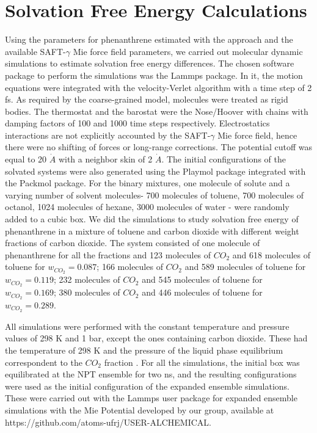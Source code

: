 \section{Solvation Free Energy Calculations}\label{solvme}

Using the parameters for phenanthrene estimated with the  approach and the available SAFT-$\gamma$ Mie force field parameters, we carried out molecular dynamic simulations to estimate solvation free energy differences. The chosen software package to perform the simulations was the Lammps package\cite{lammps}. In it, the motion equations were integrated with the velocity-Verlet algorithm \cite{verlet} with a time step of 2 fs. As required by the coarse-grained model,  molecules were treated as rigid bodies. The thermostat and the barostat were the Nose/Hoover with chains with damping factors of 100 and 1000 time steps respectively. Electrostatics interactions are not explicitly accounted by the SAFT-$\gamma$ Mie force field, hence there were no shifting of forces or long-range corrections. The potential cutoff was equal to 20 $\dot{A}$ \cite{muller2017} with a neighbor skin of 2 $\dot{A}$. The initial configurations of the solvated systems were also generated using the Playmol package integrated with the Packmol package. For the binary mixtures, one molecule of solute and a varying number of solvent molecules- 700 molecules of toluene, 700 molecules of octanol, 1024 molecules of hexane, 3000 molecules of water - were randomly added to a cubic box.  We did the simulations to study solvation free energy of phenanthrene in a mixture of toluene and carbon dioxide with different weight fractions of carbon dioxide. The  system consisted of one molecule of phenanthrene for all the fractions and 123 molecules of $CO_{2}$ and 618 molecules of toluene for $w_{CO_{2}} = 0.087$; 166 molecules of $CO_{2}$ and 589 molecules of toluene for $w_{CO_{2}} = 0.119$; 232 molecules of $CO_{2}$ and 545 molecules of toluene for $w_{CO_{2}} = 0.169$; 380 molecules of $CO_{2}$ and 446 molecules of toluene for $w_{CO_{2}} = 0.289$.

All simulations were performed with the constant temperature and pressure values of 298 K and 1 bar, except the ones containing carbon dioxide. These had the temperature of 298 K and the pressure of the liquid phase equilibrium correspondent to the $CO_{2}$ fraction \cite{co2toliq}. For all the simulations, the initial box was equilibrated at the NPT ensemble for two ns, and the resulting configurations were used as the initial configuration of the expanded ensemble simulations. These were carried out with the Lammps user package for expanded ensemble simulations with the Mie Potential developed by our group, available at https://github.com/atoms-ufrj/USER-ALCHEMICAL. 


